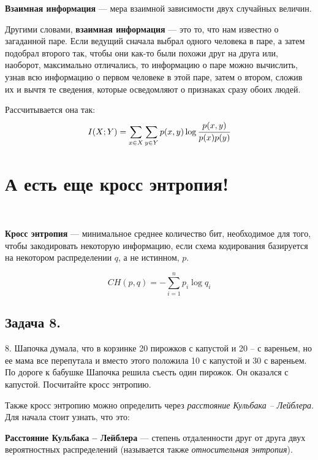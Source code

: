 \begin{siderules}
    \textbf{Взаимная информация} --- мера взаимной зависимости двух случайных величин.
\end{siderules}

Другими словами, \textbf{взаимная информация} --- это то, что нам известно о загаданной паре. Если ведущий сначала выбрал одного человека в паре, а затем подобрал второго так, чтобы они как-то были похожи друг на друга или, наоборот, максимально отличались, то информацию о паре можно вычислить, узнав всю информацию о первом человеке в этой паре, затем о втором, сложив их и вычтя те сведения, которые осведомляют о признаках сразу обоих людей.

Рассчитывается она так:
\[I(X; Y)=\sum\limits_{x\in X}\sum\limits_{y\in Y} p(x, y)\log \cfrac{p(x, y)}{p(x)p(y)} \]

\section*{А есть еще кросс энтропия!}~\
\\

\begin{siderules}
    \textbf{Кросс энтропия} --- минимальное среднее количество бит, необходимое для того, чтобы закодировать некоторую информацию, если схема кодирования базируется на некотором распределении $q$, а не истинном, $p$.
\end{siderules}

\[CH(p, q)=-\sum\limits_{i=1}^{n}p_i\log q_i \]

\subsection*{Задача 8.} 8. Шапочка думала, что в корзинке 20 пирожков с капустой и 20 – с вареньем, но ее мама все перепутала и вместо этого положила 10 с капустой и 30 с вареньем. По дороге к бабушке Шапочка решила съесть один пирожок. Он оказался с капустой. Посчитайте кросс энтропию.

Также кросс энтропию можно определить через \textit{расстояние Кульбака -- Лейблера}. Для начала стоит узнать, что это:

\begin{siderules}
    \textbf{Расстояние Кульбака -- Лейблера} --- степень отдаленности друг от друга двух вероятностных распределений (называется также \textit{относительная энтропия}). \end{siderules}
    
